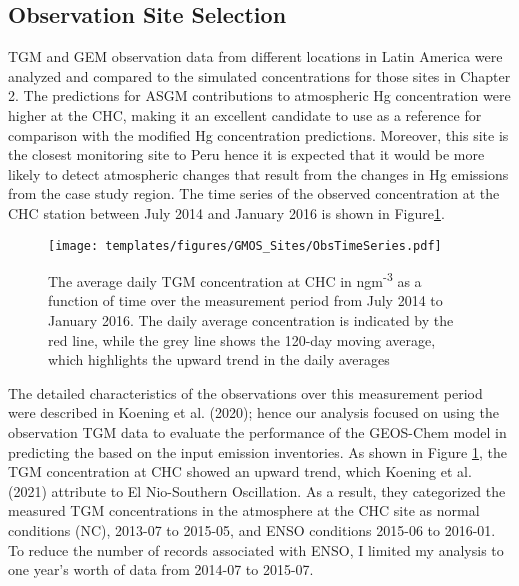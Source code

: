 
\subsection{Observation Site Selection}

\begin{flushleft}
TGM and GEM observation data from different locations in Latin America were analyzed and compared to the \gc simulated \hg concentrations for those sites in Chapter 2. The \gc predictions for ASGM contributions to atmospheric Hg concentration were higher at the CHC, making it an excellent candidate to use as a reference for comparison with the modified \gc Hg concentration predictions. Moreover, this site is the closest monitoring site to Peru hence it is expected that it would be more likely to detect atmospheric \hg changes that result from the changes in Hg emissions from the case study region. The time series of the observed concentration at the CHC station between July 2014 and January 2016 is shown in Figure\ref{fig:chc_time_series}.
\end{flushleft}

\begin{figure}[H]
  \texttt{[image: templates/figures/GMOS\_Sites/ObsTimeSeries.pdf]}
 
  \caption{The average daily TGM concentration at CHC in ngm\textsuperscript{-3} as a function of time over the measurement period from July 2014 to January 2016. The daily average concentration is indicated by the red line, while the grey line shows the 120-day moving average, which highlights the upward trend in the daily averages}
  \label{fig:chc_time_series}
  \centering
\end{figure}
\FloatBarrier
\begin{flushleft}

The detailed characteristics of the observations over this measurement period were described in Koening et al. (2020); hence our analysis focused on using the observation TGM data to evaluate the performance of the GEOS-Chem model in predicting the \hg based on the input \hg emission inventories. As shown in Figure \ref{fig:chc_time_series}, the TGM concentration at CHC showed an upward trend, which Koening et al. (2021) attribute to El Nio-Southern Oscillation\cite{koenig_seasonal_2021}. As a result, they categorized the measured TGM concentrations in the atmosphere at the CHC site as normal conditions (NC), 2013-07 to 2015-05, and ENSO conditions 2015-06 to 2016-01. To reduce the number of records associated with ENSO, I limited my analysis to one year's worth of data from 2014-07 to 2015-07.
\end{flushleft}

